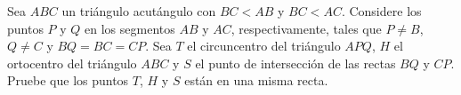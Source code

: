 Sea $ABC$ un triángulo acutángulo con $BC < AB$ y $BC < AC$. Considere los puntos $P$ y $Q$ en los segmentos $AB$ y $AC$, respectivamente, tales que $P \neq B$, $Q \neq C$ y $BQ = BC = CP$. Sea $T$ el circuncentro del triángulo $APQ$, $H$ el ortocentro del triángulo $ABC$ y $S$ el punto de intersección de las rectas $BQ$ y $CP$. Pruebe que los puntos $T$, $H$ y $S$ están en una misma recta.